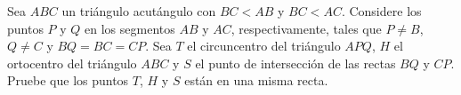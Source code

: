 Sea $ABC$ un triángulo acutángulo con $BC < AB$ y $BC < AC$. Considere los puntos $P$ y $Q$ en los segmentos $AB$ y $AC$, respectivamente, tales que $P \neq B$, $Q \neq C$ y $BQ = BC = CP$. Sea $T$ el circuncentro del triángulo $APQ$, $H$ el ortocentro del triángulo $ABC$ y $S$ el punto de intersección de las rectas $BQ$ y $CP$. Pruebe que los puntos $T$, $H$ y $S$ están en una misma recta.